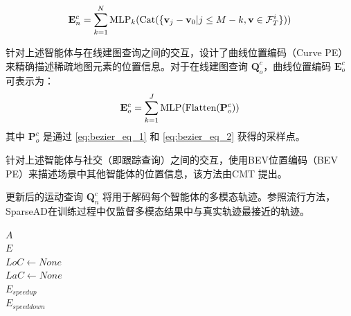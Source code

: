 \begin{equation}
\mathbf{E}_{n}^c = \sum\limits_{k = 1}^N {{\rm{ML}}{{\rm{P}}_k}({\rm{Cat}}(\{ {{\mathbf{v}}_j} - {{\mathbf{v}}_0}|j \le M - k,{\mathbf{v}} \in {\cal F}_T^i\} ))}
\label{eq:ts_align_pe_agent}
\end{equation}

针对上述智能体与在线建图查询之间的交互，设计了曲线位置编码（Curve PE）来精确描述稀疏地图元素的位置信息。对于在线建图查询 $\mathbf{Q}_{o}^c$，曲线位置编码 $\mathbf{E}^c_o$ 可表示为：
\begin{equation}
\mathbf{E}^c_o = \sum\limits_{k = 1}^J {{\rm{ML}}{{\rm{P}}}(\text{Flatten}(\mathbf{P}^c_o) )}
\end{equation}
其中 $\mathbf{P}^c_o$ 是通过 \cref{eq:bezier_eq_1} 和 \cref{eq:bezier_eq_2} 获得的采样点。

针对上述智能体与社交（即跟踪查询）之间的交互，使用BEV位置编码（BEV PE）来描述场景中其他智能体的位置信息，该方法由CMT\cite{yan2023cross} 提出。

更新后的运动查询 $\mathbf{Q}_{n}^c$ 将用于解码每个智能体的多模态轨迹。参照流行方法\cite{shi2022motion,shi2024mtr++,zhou2022hivt}，SparseAD在训练过程中仅监督多模态结果中与真实轨迹最接近的轨迹。

{\small
\begin{algorithm}[H]
\captionsetup{font=tiny}
  $A$ \\
  $E$ \\
  $LoC\leftarrow None$ \\
  $LaC\leftarrow None$ \\
  $E_{speedup}$ \\
  $E_{speeddown}$ \\

  \caption{纵向和横向关系生成}
\label{alg:relationship}
\end{algorithm}}

